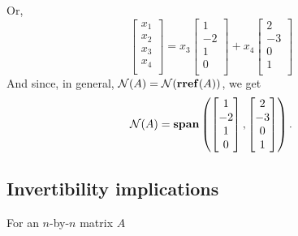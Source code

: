 \documentclass[10pt,letterpaper]{article}
\begin{document}
Or,
\[
\begin{bmatrix}
  x_1 \\
  x_2 \\
  x_3 \\
  x_4 \\
\end{bmatrix}
= x_3
\begin{bmatrix}
  1  \\
  -2 \\
  1  \\
  0  \\
\end{bmatrix}
+ x_4
\begin{bmatrix}
   2 \\
  -3 \\
   0 \\
  1  \\
\end{bmatrix}
\]
And since, in general, $\mathcal{N}(A)= \mathcal{N}( {\bf rref} (A))$, we get
\[
\mathcal{N}(A) = {\bf span} \left(
\begin{bmatrix}
  1  \\
  -2 \\
  1  \\
  0  \\
\end{bmatrix}
,
\begin{bmatrix}
   2 \\
  -3 \\
   0 \\
  1  \\
\end{bmatrix}
\right).
\]
\subsection{Invertibility implications}
\label{sec-2_3}

For an $n$-by-$n$ matrix $A$ 
\end{document}

